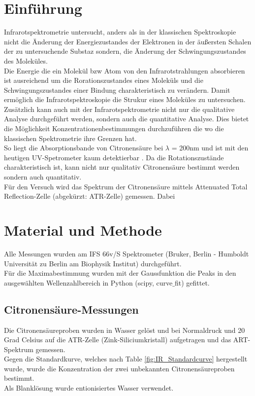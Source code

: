 \documentclass[10pt,a4paper]{article}
\begin{document}
	\section{Einführung}	
	Infrarotspektrometrie untersucht, anders als in der klassischen Spektroskopie nicht die Änderung der Energiezustandes der Elektronen in der äußersten Schalen der zu untersuchende Substaz sondern, die Änderung der Schwingungszustandes des Moleküles.\\
	Die Energie die ein Molekül bzw Atom von den Infrarotstrahlungen absorbieren ist ausreichend um die Rorationszustandes eines Moleküls und die Schwingungszustandes einer Bindung charakteristisch zu verändern.
	Damit ermöglich die Infrarotspektroskopie die Strukur eines Moleküles zu untersuchen.\\
	Zusätzlich kann auch mit der Infrarotspektrometrie nicht nur die qualitative Analyse durchgeführt werden, sondern auch die quantitative Analyse. Dies bietet die Möglichkeit Konzentrationenbestimmungen durchzuführen die wo die klassischen Spektrometrie ihre Grenzen hat.\\
	So liegt die Absorptionsbande von Citronensäure bei $\lambda$ = 200nm und ist mit den heutigen UV-Spetrometer kaum detektierbar \cite{Citricacid_UV}. Da die Rotationszustände charakteristisch ist, kann nicht nur qualitativ Citronensäure bestimmt werden sondern auch quantitativ.\\
	Für den Versuch wird das Spektrum der Citronensäure mittels Attenuated Total Reflection-Zelle (abgekürzt: ATR-Zelle) gemessen. Dabei 
	
	
	
	
	
	
	
	
	
	\section{Material und Methode}
	Alle Messungen wurden am IFS 66v/S Spektrometer (Bruker, Berlin - Humboldt Universität zu Berlin am Biophysik Institut) durchgeführt.\\
	Für die Maximabestimmung wurden mit der Gaussfunktion die Peaks in den ausgewählten Wellenzahlbereich in Python (scipy, curve$\_$fit) gefittet.
	
	\subsection{Citronensäure-Messungen}
	Die Citronensäureproben wurden in Wasser gelöst und bei Normaldruck und 20 Grad Celsius auf die ATR-Zelle (Zink-Siliciumkristall) aufgetragen und das ART-Spektrum gemessen.\\
	Gegen die Standardkurve, welches nach Table \ref{fig:IR_Standardcurve} hergestellt wurde, wurde die Konzentration der zwei unbekannten Citronensäureproben bestimmt.\\
	Als Blanklösung wurde entionisiertes Wasser verwendet.\\
	
\end{document}
